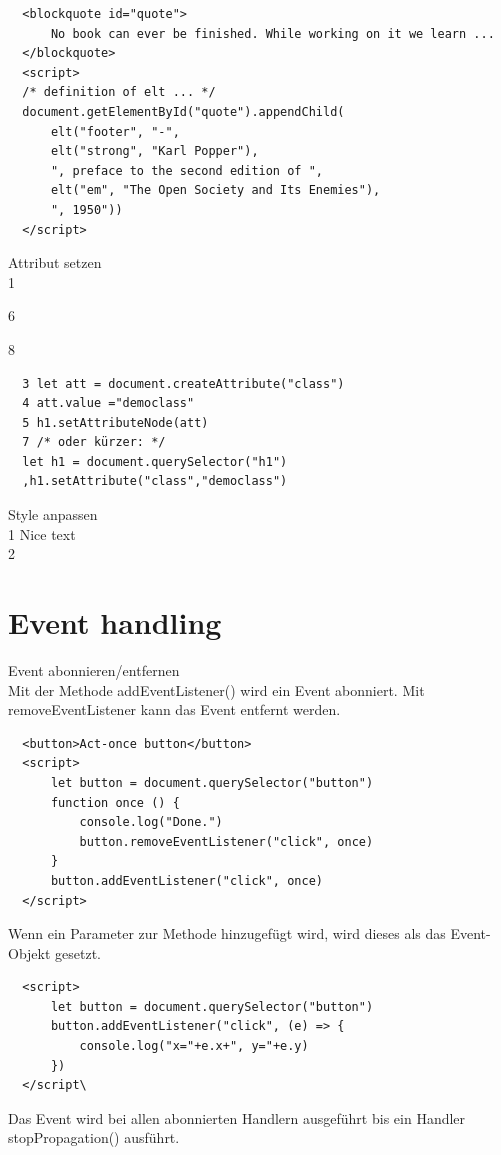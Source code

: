   \begin{verbatim}
  <blockquote id="quote">
      No book can ever be finished. While working on it we learn ...
  </blockquote>
  <script>
  /* definition of elt ... */
  document.getElementById("quote").appendChild(
      elt("footer", "-",
      elt("strong", "Karl Popper"),
      ", preface to the second edition of ",
      elt("em", "The Open Society and Its Enemies"),
      ", 1950"))
  </script>
  \end{verbatim}
  
  Attribut setzen\\
  1
  
  6
  
  8
  
  \begin{verbatim}
  3 let att = document.createAttribute("class")
  4 att.value ="democlass"
  5 h1.setAttributeNode(att)
  7 /* oder kürzer: */
  let h1 = document.querySelector("h1")
  ,h1.setAttribute("class","democlass")
  \end{verbatim}
  
  Style anpassen\\
  1 Nice text\\
  2 
  
  \section*{Event handling}
  Event abonnieren/entfernen\\
  Mit der Methode addEventListener() wird ein Event abonniert. Mit removeEventListener kann das Event entfernt werden.
  
  \begin{verbatim}
  <button>Act-once button</button>
  <script>
      let button = document.querySelector("button")
      function once () {
          console.log("Done.")
          button.removeEventListener("click", once)
      }
      button.addEventListener("click", once)
  </script>
  \end{verbatim}
  
  Wenn ein Parameter zur Methode hinzugefügt wird, wird dieses als das Event-Objekt gesetzt.
  
  \begin{verbatim}
  <script>
      let button = document.querySelector("button")
      button.addEventListener("click", (e) => {
          console.log("x="+e.x+", y="+e.y)
      })
  </script\
  \end{verbatim}
  
  Das Event wird bei allen abonnierten Handlern ausgeführt bis ein Handler stopPropagation() ausführt.
  
